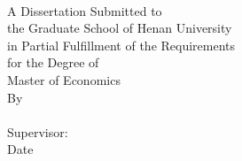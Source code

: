 

\thispagestyle{empty}
\renewcommand{\baselinestretch}{1.5}  %
\ \vspace{1.2cm}
{\tnewroman
\begin{center}{ \the\Etitle \par}\end{center}
\vspace{5cm}
\begin{center}
A Dissertation Submitted to\\
the Graduate School of Henan University\\
in Partial Fulfillment of the Requirements\\
for the Degree of \\
Master of Economics\\
\vspace{4cm}
\renewcommand{\baselinestretch}{2}
By\\
\emph{\the\Eauthor}\\
Supervisor:\the\Esupervisor\\



Date \the\Edate

\end{center}
}
  \iflib
  \else
  \newpage
  \thispagestyle{empty}
  \cleardoublepage
  \fi
